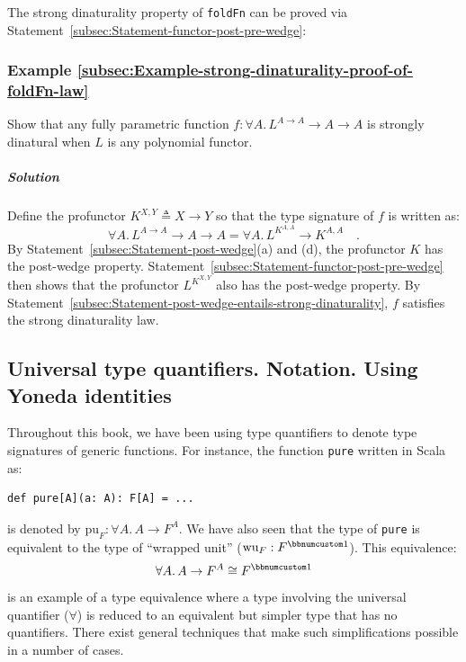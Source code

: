 The strong dinaturality property of \lstinline!foldFn! can be proved
via Statement~\ref{subsec:Statement-functor-post-pre-wedge}:

\subsubsection{Example \label{subsec:Example-strong-dinaturality-proof-of-foldFn-law}\ref{subsec:Example-strong-dinaturality-proof-of-foldFn-law}}

Show that any fully parametric function $f:\forall A.\,L^{A\rightarrow A}\rightarrow A\rightarrow A$
is strongly dinatural when $L$ is any polynomial functor.

\subparagraph{Solution}

Define the profunctor $K^{X,Y}\triangleq X\rightarrow Y$ so that
the type signature of $f$ is written as:
\[
\forall A.\,L^{A\rightarrow A}\rightarrow A\rightarrow A=\forall A.\,L^{K^{A,A}}\rightarrow K^{A,A}\quad.
\]
By Statement~\ref{subsec:Statement-post-wedge}(a) and (d), the profunctor
$K$ has the post-wedge property. Statement~\ref{subsec:Statement-functor-post-pre-wedge}
then shows that the profunctor $L^{K^{X,Y}}$ also has the post-wedge
property. By Statement~\ref{subsec:Statement-post-wedge-entails-strong-dinaturality},
$f$ satisfies the strong dinaturality law. 

\subsection{Universal type quantifiers. Notation. Using Yoneda identities\label{subsec:Universal-type-quantifiers}}

Throughout this book, we have been using type quantifiers to denote
type signatures of generic functions. For instance, the function \lstinline!pure!
written in Scala as:
\begin{lstlisting}
def pure[A](a: A): F[A] = ...
\end{lstlisting}
is denoted by $\text{pu}_{F}:\forall A.\,A\rightarrow F^{A}$. We
have also seen that the type of \lstinline!pure! is equivalent to
the type of \textsf{``}wrapped unit\textsf{''} ($\text{wu}_{F}:F^{\bbnum 1}$). This
equivalence:
\[
\forall A.\,A\rightarrow F^{A}\cong F^{\bbnum 1}
\]
is an example of a type equivalence where a type involving the universal
quantifier ($\forall$) is reduced to an equivalent but simpler type
that has no quantifiers. There exist general techniques that make
such simplifications possible in a number of cases.

